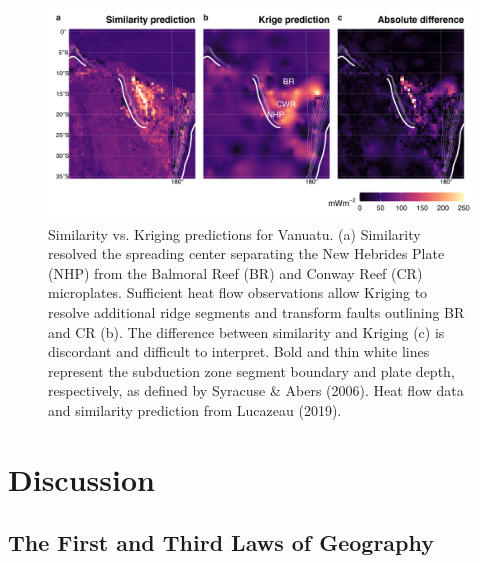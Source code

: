 \documentclass[draft,linenumbers]{agujournal2018}
\begin{document}
\begin{figure}[h]

{\centering \includegraphics[width=0.95\linewidth,]{../figs/diff/custom/Vanuatu} 

}

\caption{Similarity vs. Kriging predictions for Vanuatu. (a) Similarity resolved the spreading center separating the New Hebrides Plate (NHP) from the Balmoral Reef (BR) and Conway Reef (CR) microplates. Sufficient heat flow observations allow Kriging to resolve additional ridge segments and transform faults outlining BR and CR (b). The difference between similarity and Kriging (c) is discordant and difficult to interpret. Bold and thin white lines represent the subduction zone segment boundary and plate depth, respectively, as defined by Syracuse \& Abers (2006). Heat flow data and similarity prediction from Lucazeau (2019).}\label{fig:vanuatu.diff}
\end{figure}

\clearpage

\section{Discussion}

\subsection{The First and Third Laws of Geography}
\end{document}
